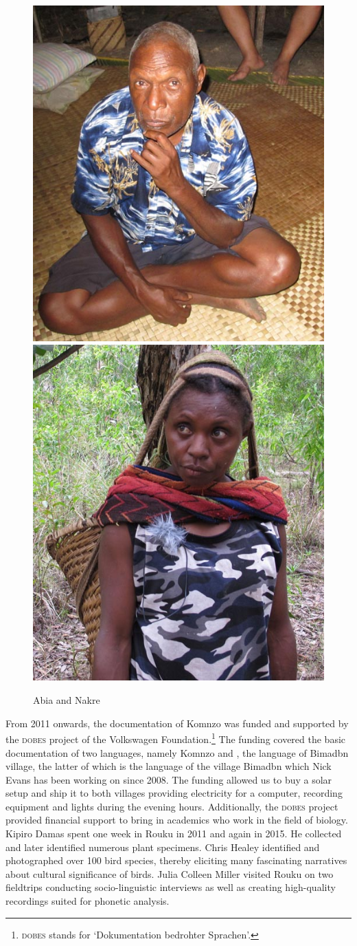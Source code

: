 \begin{figure}
	\includegraphics[width=.4\textwidth]{figures/foto-abia.jpg}
	\includegraphics[width=.4\textwidth]{figures/foto-nakre.jpg}
	\caption{Abia and Nakre}
	\label{fig:abia-nakre}
\end{figure}%

\largerpage
From 2011 onwards, the documentation of Komnzo was funded and supported by the \textsc{dobes} project of the Volkswagen Foundation.\footnote{\textsc{dobes} stands for  `Dokumentation bedrohter Sprachen'.} The funding covered the basic documentation of two languages, namely Komnzo and , the language of Bimadbn village, the latter of which is the language of the village Bimadbn which Nick Evans has been working on since 2008. The funding allowed us to buy a solar setup and ship it to both villages providing electricity for a computer, recording equipment and lights during the evening hours. Additionally, the \textsc{dobes} project provided financial support to bring in academics who work in the field of biology. Kipiro Damas spent one week in Rouku in 2011 and again in 2015. He collected and later identified numerous plant specimens. Chris Healey identified and photographed over 100 bird species, thereby eliciting many fascinating narratives about cultural significance of birds. Julia Colleen Miller visited Rouku on two fieldtrips conducting socio-linguistic interviews as well as creating high-quality recordings suited for phonetic analysis.


